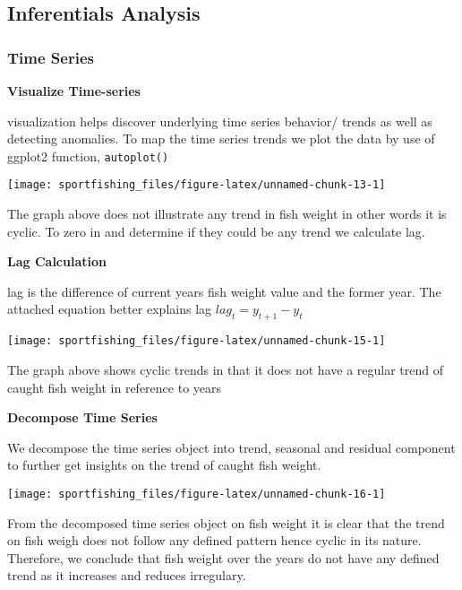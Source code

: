 \documentclass[
]{article}
\begin{document}
\newpage

\subsection{Inferentials Analysis}\label{inferentials-analysis}

\subsubsection{Time Series}\label{time-series}

\textbf{Visualize Time-series}

visualization helps discover underlying time series behavior/ trends as
well as detecting anomalies. To map the time series trends we plot the
data by use of ggplot2 function, \texttt{autoplot()}

\begin{center}\texttt{[image: sportfishing\_files/figure-latex/unnamed-chunk-13-1]} \end{center}

The graph above does not illustrate any trend in fish weight in other
words it is cyclic. To zero in and determine if they could be any trend
we calculate lag.

\textbf{Lag Calculation}

lag is the difference of current years fish weight value and the former
year. The attached equation better explains lag
\textbf{\(lag_{t} = y_{t+1} - y_{t}\)}

\begin{center}\texttt{[image: sportfishing\_files/figure-latex/unnamed-chunk-15-1]} \end{center}

The graph above shows cyclic trends in that it does not have a regular
trend of caught fish weight in reference to years

\newpage

\textbf{Decompose Time Series}

We decompose the time series object into trend, seasonal and residual
component to further get insights on the trend of caught fish weight.

\begin{center}\texttt{[image: sportfishing\_files/figure-latex/unnamed-chunk-16-1]} \end{center}

From the decomposed time series object on fish weight it is clear that
the trend on fish weigh does not follow any defined pattern hence cyclic
in its nature. Therefore, we conclude that fish weight over the years do
not have any defined trend as it increases and reduces irregulary.
\end{document}
